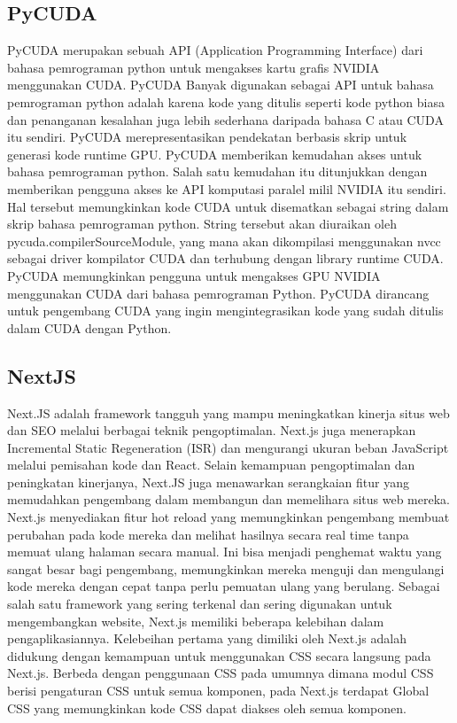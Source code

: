 \subsection{PyCUDA}
PyCUDA merupakan sebuah API (Application Programming Interface) dari bahasa pemrograman python untuk mengakses kartu grafis NVIDIA menggunakan CUDA. PyCUDA Banyak digunakan sebagai API untuk bahasa pemrograman python adalah karena kode yang ditulis seperti kode python biasa dan penanganan kesalahan juga lebih sederhana daripada bahasa C atau CUDA itu sendiri\parencite{Koprawi2020}. PyCUDA merepresentasikan pendekatan berbasis skrip untuk generasi kode runtime GPU. PyCUDA memberikan kemudahan akses untuk bahasa pemrograman python. Salah satu kemudahan itu ditunjukkan dengan memberikan pengguna akses ke API komputasi paralel milil NVIDIA itu sendiri. Hal tersebut memungkinkan kode CUDA untuk disematkan sebagai string dalam skrip bahasa pemrograman python. String tersebut akan diuraikan oleh pycuda.compilerSourceModule, yang mana akan dikompilasi menggunakan nvcc sebagai driver kompilator CUDA dan terhubung dengan library runtime CUDA. PyCUDA memungkinkan pengguna untuk mengakses GPU NVIDIA menggunakan CUDA dari bahasa pemrograman Python. PyCUDA dirancang untuk pengembang CUDA yang ingin mengintegrasikan kode yang sudah ditulis dalam CUDA dengan Python\parencite{leung2023experience}.

\subsection{NextJS}
Next.JS adalah framework tangguh yang mampu meningkatkan kinerja situs web dan SEO melalui berbagai teknik pengoptimalan. Next.js juga menerapkan Incremental Static Regeneration (ISR) dan mengurangi ukuran beban JavaScript melalui pemisahan kode dan React. Selain kemampuan pengoptimalan dan peningkatan kinerjanya, Next.JS juga menawarkan serangkaian fitur yang memudahkan pengembang dalam membangun dan memelihara situs web mereka. Next.js menyediakan fitur hot reload yang memungkinkan pengembang membuat perubahan pada kode mereka dan melihat hasilnya secara real time tanpa memuat ulang halaman secara manual. Ini bisa menjadi penghemat waktu yang sangat besar bagi pengembang, memungkinkan mereka menguji dan mengulangi kode mereka dengan cepat tanpa perlu pemuatan ulang yang berulang\parencite{Patel2023}. Sebagai salah satu framework yang sering terkenal dan sering digunakan untuk mengembangkan website, Next.js memiliki beberapa kelebihan dalam pengaplikasiannya. Kelebeihan pertama yang dimiliki oleh Next.js adalah didukung dengan kemampuan untuk menggunakan CSS secara langsung pada Next.js. Berbeda dengan penggunaan CSS pada umumnya dimana modul CSS berisi pengaturan CSS untuk semua komponen, pada Next.js terdapat Global CSS yang memungkinkan kode CSS dapat diakses oleh semua komponen\parencite{lazuardy2022}.

